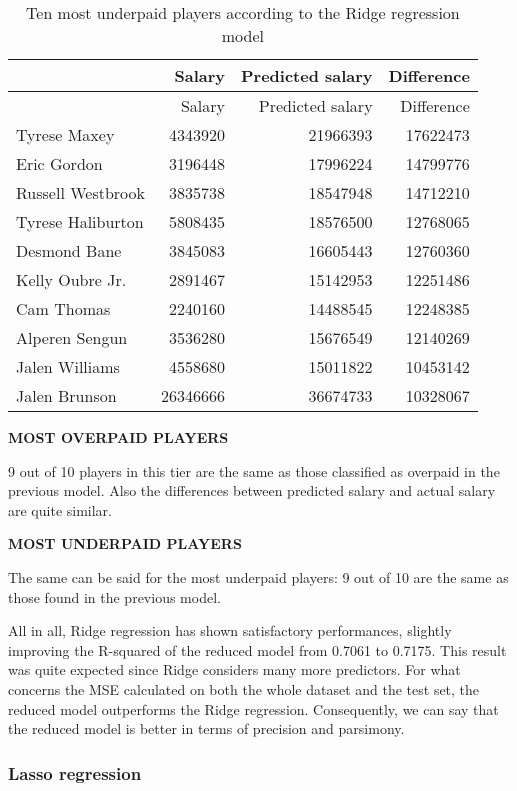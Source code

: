 \documentclass[
]{article}
\begin{document}
\begin{longtable}[]{@{}lrrr@{}}
\caption{Ten most underpaid players according to the Ridge regression
model}\tabularnewline
\toprule()
& Salary & Predicted salary & Difference \\
\midrule()
\endfirsthead
\toprule()
& Salary & Predicted salary & Difference \\
\midrule()
\endhead
Tyrese Maxey & 4343920 & 21966393 & 17622473 \\
Eric Gordon & 3196448 & 17996224 & 14799776 \\
Russell Westbrook & 3835738 & 18547948 & 14712210 \\
Tyrese Haliburton & 5808435 & 18576500 & 12768065 \\
Desmond Bane & 3845083 & 16605443 & 12760360 \\
Kelly Oubre Jr. & 2891467 & 15142953 & 12251486 \\
Cam Thomas & 2240160 & 14488545 & 12248385 \\
Alperen Sengun & 3536280 & 15676549 & 12140269 \\
Jalen Williams & 4558680 & 15011822 & 10453142 \\
Jalen Brunson & 26346666 & 36674733 & 10328067 \\
\bottomrule()
\end{longtable}

\textbf{MOST OVERPAID PLAYERS}

9 out of 10 players in this tier are the same as those classified as
overpaid in the previous model. Also the differences between predicted
salary and actual salary are quite similar.

\textbf{MOST UNDERPAID PLAYERS}

The same can be said for the most underpaid players: 9 out of 10 are the
same as those found in the previous model.

All in all, Ridge regression has shown satisfactory performances,
slightly improving the R-squared of the reduced model from 0.7061 to
0.7175. This result was quite expected since Ridge considers many more
predictors. For what concerns the MSE calculated on both the whole
dataset and the test set, the reduced model outperforms the Ridge
regression. Consequently, we can say that the reduced model is better in
terms of precision and parsimony.

\hypertarget{lasso-regression}{%
\subsubsection{Lasso regression}\label{lasso-regression}}
\end{document}
